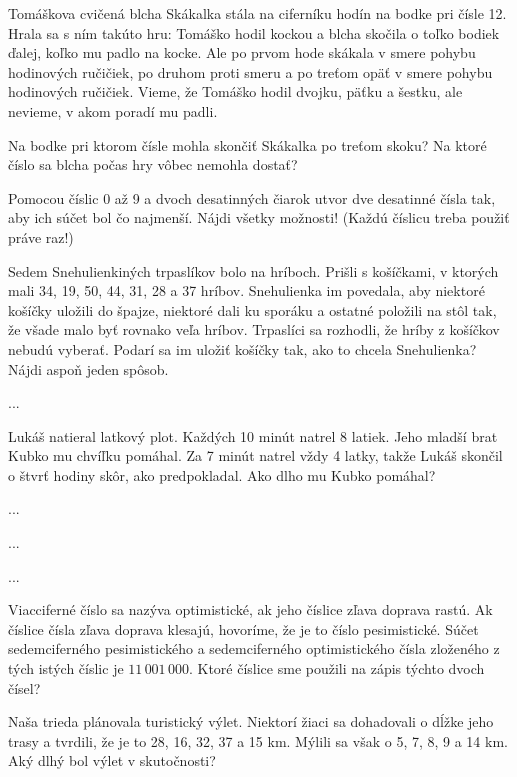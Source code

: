 {%
Tomáškova cvičená blcha Skákalka stála na ciferníku hodín
na bodke pri čísle 12. Hrala sa s ním takúto hru: Tomáško
hodil kockou a blcha skočila o toľko bodiek ďalej, koľko mu
padlo na kocke. Ale po prvom hode skákala v smere pohybu
hodinových ručičiek, po druhom proti smeru a po treťom opäť
v smere pohybu hodinových ručičiek. Vieme, že Tomáško
hodil dvojku, päťku a šestku, ale nevieme, v akom poradí mu
padli.
\begin{itemize}
 Na bodke pri ktorom čísle mohla skončiť
Skákalka po treťom skoku?
 Na ktoré číslo sa blcha počas hry vôbec
nemohla dostať?
\end{itemize}
}

{%
Pomocou číslic 0 až 9 a dvoch desatinných čiarok utvor dve desatinné čísla tak, aby ich súčet
bol čo najmenší. Nájdi všetky možnosti! (Každú číslicu treba použiť práve raz!)}

{%
Sedem Snehulienkiných trpaslíkov bolo na hríboch. Prišli s košíčkami, v ktorých mali 34, 19,
50, 44, 31, 28 a 37 hríbov. Snehulienka im povedala, aby niektoré košíčky uložili do špajze,
niektoré dali ku sporáku a ostatné položili na stôl tak, že všade malo byť rovnako veľa hríbov.
Trpaslíci sa rozhodli, že hríby z košíčkov nebudú vyberať. Podarí sa im uložiť košíčky tak, ako
to chcela Snehulienka? Nájdi aspoň jeden spôsob.}

{%
...}

{%
Lukáš natieral latkový plot. Každých 10 minút natrel 8 latiek. Jeho mladší brat Kubko mu
chvíľku pomáhal. Za 7 minút natrel vždy 4 latky, takže Lukáš skončil o štvrť hodiny skôr, ako
predpokladal. Ako dlho mu Kubko pomáhal?}

{%
...}

{%
...}

{%
...}

{%
Viacciferné číslo sa nazýva optimistické, ak jeho číslice zľava doprava rastú. Ak číslice čísla
zľava doprava klesajú, hovoríme, že je to číslo pesimistické. Súčet sedemciferného
pesimistického a sedemciferného optimistického čísla
zloženého z tých istých číslic je $11\,001\,000$. Ktoré
číslice sme použili na zápis týchto dvoch čísel?}

{%
Naša trieda plánovala turistický výlet. Niektorí žiaci sa
dohadovali o dĺžke jeho trasy a tvrdili, že je to 28, 16, 32, 37 a 15 km. Mýlili
sa však o 5, 7, 8, 9 a 14 km. Aký dlhý bol výlet v skutočnosti?}

